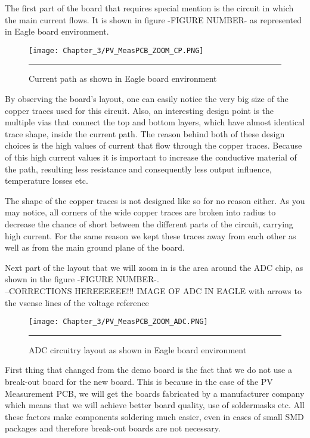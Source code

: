The first part of the board that requires special mention is the circuit in which the main current flows. It is shown in figure -FIGURE NUMBER- as represented in Eagle board environment.\\


\begin{figure}[htbp]
	\centering
		\texttt{[image: Chapter\_3/PV\_MeasPCB\_ZOOM\_CP.PNG]}
		\rule{35em}{0.5pt}
	\caption{Current path as shown in Eagle board environment}
	\label{fig:PV_MeasPCB_ZOOM_CP}
\end{figure}

By observing the board's layout, one can easily notice the very big size of the copper traces used for this circuit. Also, an interesting design point is the multiple vias that connect the top and bottom layers, which have almost identical trace shape, inside the current path. The reason behind both of these design choices is the high values of current that flow through the copper traces. Because of this high current values it is important to increase the conductive material of the path, resulting less resistance and consequently less output influence, temperature losses etc.

The shape of the copper traces is not designed like so for no reason either. As you may notice, all corners of the wide copper traces are broken into radius to decrease the chance of short between the different parts of the circuit, carrying high current. For the same reason we kept these traces away from each other as well as from the main ground plane of the board.

Next part of the layout that we will zoom in is the area around the ADC chip, as shown in the figure -FIGURE NUMBER-.\\

--CORRECTIONS HEREEEEEE!!! IMAGE OF ADC IN EAGLE with arrows to the vsense lines of the voltage reference\\
\begin{figure}[htbp]
	\centering
		\texttt{[image: Chapter\_3/PV\_MeasPCB\_ZOOM\_ADC.PNG]}
		\rule{35em}{0.5pt}
	\caption{ADC circuitry layout as shown in Eagle board environment}
	\label{fig:PV_MeasPCB_ZOOM_ADC}
\end{figure}

First thing that changed from the demo board is the fact that we do not use a break-out board for the new board. This is because in the case of the PV Measurement PCB, we will get the boards fabricated by a manufacturer company which means that we will achieve better board quality, use of soldermasks etc. All these factors make components soldering much easier, even in cases of small SMD packages and therefore break-out boards are not necessary.

